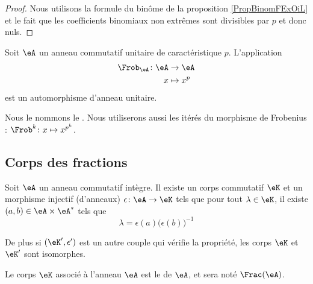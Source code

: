 \begin{proof}
    Nous utilisons la formule du binôme de la proposition \ref{PropBinomFExOiL} et le fait que les coefficients binomiaux non extrêmes sont divisibles par \( p\) et donc nuls.
\end{proof}

\begin{proposition} \label{PropFrobHAMkTY}
    Soit \( \eA\) un anneau commutatif unitaire de caractéristique \( p\). L'application
    \begin{equation}
        \begin{aligned}
            \Frob_\eA\colon \eA&\to \eA \\
            x&\mapsto x^p 
        \end{aligned}
    \end{equation}
    est un automorphisme d'anneau unitaire.
\end{proposition}
Nous le nommons le . Nous utiliserons aussi les itérés du morphisme de Frobenius : \( \Frob^k\colon x\mapsto x^{p^k}\).

\subsection{Corps des fractions}

\begin{theorem}     \label{ThogbhWgo}
    Soit \( \eA\) un anneau commutatif intègre. Il existe un corps commutatif \( \eK\) et un morphisme injectif (d'anneaux) \( \epsilon\colon \eA\to \eK\) tels que pour tout \( \lambda\in\eK\), il existe \( (a,b)\in \eA\times \eA^*\) tels que
    \begin{equation}
        \lambda=\epsilon(a)\big( \epsilon(b) \big)^{-1}
    \end{equation}

    De plus si \( (\eK',\epsilon')\) est un autre couple qui vérifie la propriété, les corps \( \eK\) et \( \eK'\) sont isomorphes.
\end{theorem}
Le corps \( \eK\) associé à l'anneau \( \eA\) est le  de \( \eA\), et sera noté \( \Frac(\eA)\).

